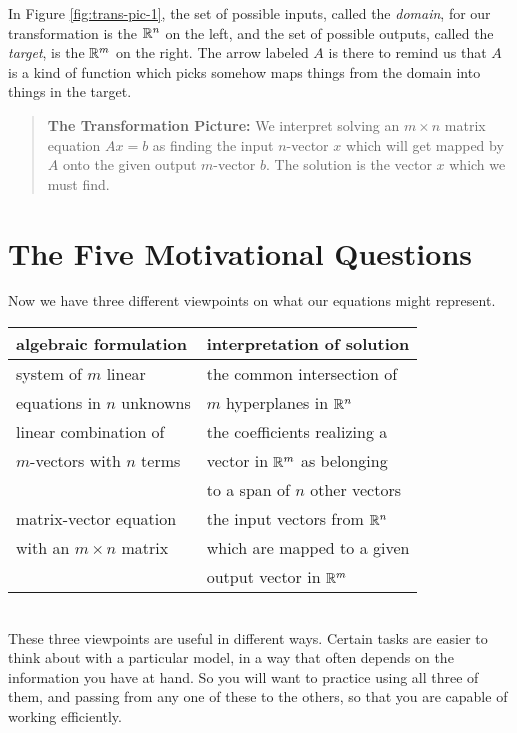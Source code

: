 \documentclass[00-livre-main.tex]{subfiles}
\begin{document}
In Figure \ref{fig:trans-pic-1}, the set of possible inputs, called the \emph{domain}, for our transformation is the $\mathbb{R}^n$ on the left, and the set of possible outputs, called the \emph{target}, is the $\mathbb{R}^m$ on the right. The arrow labeled $A$ is there to remind us that $A$ is a kind of function which picks somehow maps things from the domain into things in the target.



\begin{quote}
\textbf{The Transformation Picture:} We interpret solving an $m\times n$ matrix equation $Ax=b$ as finding the input $n$-vector $x$ which will get mapped by $A$ onto the given output $m$-vector $b$. The solution is the vector $x$ which we must find.
\end{quote}






\section*{The Five Motivational Questions}

Now we have three different viewpoints on what our equations might represent.\\

\begin{tabular}{l||l}
algebraic formulation & interpretation of solution\\
\hline
system of $m$ linear  & the common intersection of\\
equations in $n$ unknowns &  $m$  hyperplanes in $\mathbb{R}^n$ \\
\hline
linear combination of & the coefficients realizing a\\
$m$-vectors with $n$ terms & vector in $\mathbb{R}^m$ as belonging \\
& to a span of $n$ other vectors \\ 
\hline
matrix-vector equation & the input vectors from $\mathbb{R}^n$\\
with an $m\times n$ matrix &  which are mapped to a given\\
&  output vector in $\mathbb{R}^m$\\
\end{tabular}\\

These three viewpoints are useful in different ways. Certain tasks are easier to 
think about with a particular model, in a way that often depends on the 
information you have at hand. So you will want to practice using all three of them, 
and passing from any one of these to the others, so that you are capable of 
working efficiently.
\end{document}
